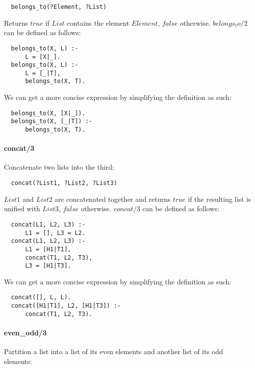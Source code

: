 \documentclass{article}
\begin{document}
\begin{multicols}{2}
  \begin{lstlisting}
  belongs_to(?Element, ?List)
  \end{lstlisting} 
  
  Returns $true$ if $List$ contains the element $Element$, $false$ otherwise. $belongs_to/2$ can be defined as follows:

  \begin{lstlisting}
  belongs_to(X, L) :-
      L = [X|_].
  belongs_to(X, L) :-
      L = [_|T],
      belongs_to(X, T).
  \end{lstlisting} 
  
  We can get a more concise expression by simplifying the definition as such:

  \begin{lstlisting}
  belongs_to(X, [X|_]).
  belongs_to(X, [_|T]) :-
      belongs_to(X, T).
  \end{lstlisting} 
  
  \paragraph{concat/3} Concatenate two lists into the third:
  
  \begin{lstlisting}
  concat(?List1, ?List2, ?List3)
  \end{lstlisting} 
  
  $List1$ and $List2$ are concatenated together and returns $true$ if the resulting list is unified with $List3$, $false$ otherwise. $concat/3$ can be defined as follows:

  \begin{lstlisting}
  concat(L1, L2, L3) :-
      L1 = [], L3 = L2.
  concat(L1, L2, L3) :- 
      L1 = [H1|T1],
      concat(T1, L2, T3),
      L3 = [H1|T3].
  \end{lstlisting} 
  
  We can get a more concise expression by simplifying the definition as such:

  \begin{lstlisting}
  concat([], L, L).
  concat([H1|T1], L2, [H1|T3]) :- 
      concat(T1, L2, T3).
  \end{lstlisting}
  
  \paragraph{even\_odd/3} Partition a list into a list of its even elements and another list of its odd elements:
  

\end{multicols}
\end{document}
